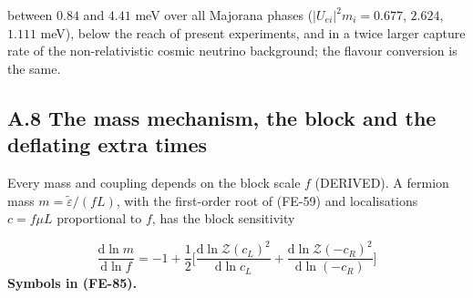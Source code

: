\documentclass[
  10pt,
]{article}
\begin{document}
between \(0.84\) and \(4.41\) meV over all Majorana phases
(\(\lvert U_{ei}\rvert^2m_i = 0.677\), \(2.624\), \(1.111\) meV), below
the reach of present experiments, and in a twice larger capture rate of
the non-relativistic cosmic neutrino background; the flavour conversion
is the same.

\hypertarget{a.8-the-mass-mechanism-the-block-and-the-deflating-extra-times}{%
\subsection*{A.8 The mass mechanism, the block and the deflating extra
times}\label{a.8-the-mass-mechanism-the-block-and-the-deflating-extra-times}}

Every mass and coupling depends on the block scale \(f\) (DERIVED). A
fermion mass \(m = \tilde\varepsilon/(fL)\), with the first-order root
of (FE-59) and localisations \(c = f\mu L\) proportional to \(f\), has
the block sensitivity

\[
\frac{\mathrm{d}\ln m}{\mathrm{d}\ln f} = -1 +
 \frac12\Big[\frac{\mathrm{d}\ln\mathcal{Z}(c_L)^2}{\mathrm{d}\ln c_L}
 + \frac{\mathrm{d}\ln\mathcal{Z}(-c_R)^2}{\mathrm{d}\ln(-c_R)}\Big] \tag{FE-85}
\] \textbf{Symbols in (FE-85).}
\end{document}
